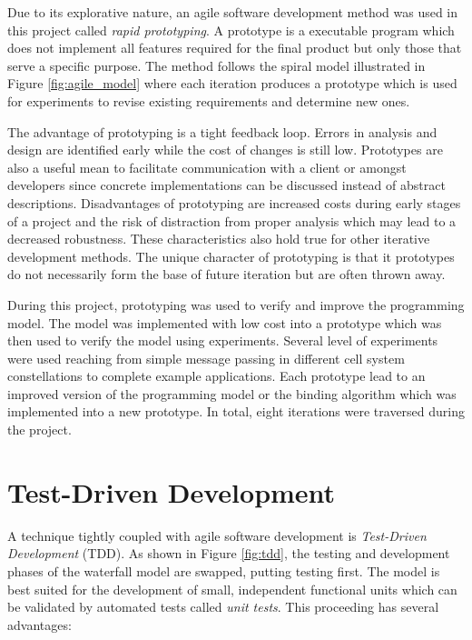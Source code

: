 Due to its explorative nature, an agile software development method was used in this project called \textit{rapid prototyping}. A prototype is a executable program which does not implement all features required for the final product but only those that serve a specific purpose. The method follows the spiral model illustrated in Figure \ref{fig:agile_model} where each iteration produces a prototype which is used for experiments to revise existing requirements and determine new ones.

The advantage of prototyping is a tight feedback loop. Errors in analysis and design are identified early while the cost of changes is still low. Prototypes are also a useful mean to facilitate communication with a client or amongst developers since concrete implementations can be discussed instead of abstract descriptions. Disadvantages of prototyping are increased costs during early stages of a project and the risk of distraction from proper analysis which may lead to a decreased robustness. These characteristics also hold true for other iterative development methods. The unique character of prototyping is that it prototypes do not necessarily form the base of future iteration but are often thrown away.

During this project, prototyping was used to verify and improve the programming model. The model was implemented with low cost into a prototype which was then used to verify the model using experiments. Several level of experiments were used reaching from simple message passing in different cell system constellations to complete example applications. Each prototype lead to an improved version of the programming model or the binding algorithm which was implemented into a new prototype. In total, eight iterations were traversed during the project.


\section{Test-Driven Development}
\label{sec:tdd}

A technique tightly coupled with agile software development is \textit{Test-Driven Development} (TDD). As shown in Figure \ref{fig:tdd}, the testing and development phases of the waterfall model are swapped, putting testing first. The model is best suited for the development of small, independent functional units which can be validated by automated tests called \textit{unit tests}. This proceeding has several advantages: \cite{TestDrivenDevelopment}

